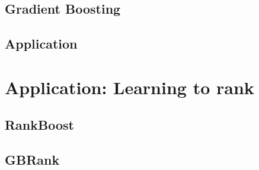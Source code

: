 \documentclass[a4paper]{article}
\begin{document}
\subsection{Gradient Boosting}
\subsection{Application}

\section{Application: Learning to rank}
\subsection{RankBoost}
\subsection{GBRank}
\end{document}
